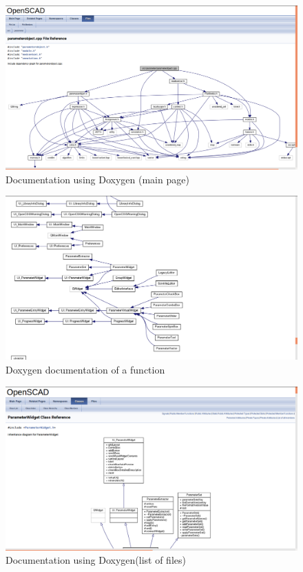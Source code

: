 \begin{figure}[H]
\centering \includegraphics[scale=.35]{images/doc.png}
\caption{Documentation using Doxygen (main page)}
\end{figure}


\begin{figure}[H]
\centering \includegraphics[scale=.35]{images/doc1.png}
\caption{Doxygen documentation of a function}
\end{figure}
\begin{figure}[H]
\centering \includegraphics[scale=.35]{images/doc2.png}
\caption{Documentation using Doxygen(list of files)}
\end{figure}


